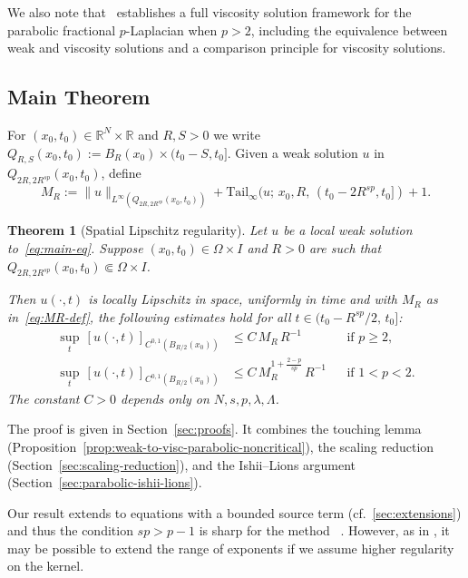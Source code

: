 \documentclass[11pt, a4paper, twoside]{article}
\newtheorem{theorem}{Theorem}[section]
\theoremstyle{definition}
\theoremstyle{remark}
\newcommand{\R}{\mathbb{R}}
\begin{document}
We also note that~\cite{JesusSobralUrbano2026} establishes a
full viscosity solution framework for the parabolic fractional
$p$-Laplacian when $p>2$, including the equivalence between weak and
viscosity solutions and a comparison principle for viscosity
solutions. 

\subsection{Main Theorem}

For $(x_0, t_0) \in \R^N \times \R$ and $R, S > 0$ we write
$Q_{R,S}(x_0,t_0) := B_R(x_0) \times (t_0 - S, t_0]$.
Given a weak solution $u$ in $Q_{2R, 2R^{sp}}(x_0, t_0)$,
define
\begin{equation}\label{eq:MR-def}
  M_R := \|u\|_{L^\infty(Q_{2R,2R^{sp}}(x_0,t_0))}
       + \mathrm{Tail}_\infty(u;\, x_0, R,\,
         (t_0-2R^{sp}, t_0])
       + 1.
\end{equation}

\begin{theorem}[Spatial Lipschitz regularity]
\label{thm:main}
   Let $u$ be a local weak solution to~\eqref{eq:main-eq}. Suppose $(x_0, t_0) \in \Omega \times I$
   and $R > 0$ are such that
  $Q_{2R,2R^{sp}}(x_0,t_0) \Subset \Omega \times I$.
  
  Then $u(\cdot, t)$ is locally Lipschitz in space,
  uniformly in time and  with $M_R$ as
  in~\eqref{eq:MR-def}, the following estimates hold for
  all $t \in (t_0 - R^{sp}/2,\, t_0]$:
  \begin{align}
    \sup_{t}\,[u(\cdot,t)]_{C^{0,1}(B_{R/2}(x_0))}
    &\le C\, M_R\, R^{-1}
    &&\text{if } p \ge 2, \label{eq:lip-pge2}\\
    \sup_{t}\,[u(\cdot,t)]_{C^{0,1}(B_{R/2}(x_0))}
    &\le C\, M_R^{1+\frac{2-p}{sp}}\, R^{-1}
    &&\text{if } 1 < p < 2. \label{eq:lip-plt2}
  \end{align}
  The constant $C > 0$ depends only on $N, s, p,
  \lambda, \Lambda$.
\end{theorem}

The proof is given in Section~\ref{sec:proofs}. It combines
the touching lemma
(Proposition~\ref{prop:weak-to-visc-parabolic-noncritical}),
the scaling reduction
(Section~\ref{sec:scaling-reduction}), and the Ishii--Lions
argument (Section~\ref{sec:parabolic-ishii-lions}).

\begin{remark}
\label{rem:sharpness}
  Our result extends to equations with a bounded source term (cf.~\cref{sec:extensions}) and thus the condition $sp>p-1$ is sharp for the method ~\cite[Example~1.6]{BrascoLindgrenSchikorra2018}. However, as in \cite{BiswasSen2025}, it may be possible to extend the range of exponents if we assume higher regularity on the kernel.
\end{remark}
\end{document}
